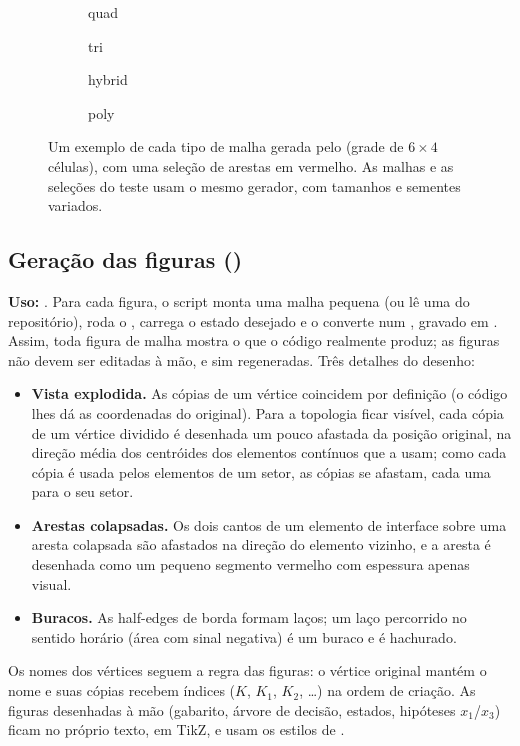 \begin{figure}[ht]
\centering
\begin{subfigure}[b]{0.24\linewidth}\centering\resizebox{\linewidth}{!}{}\caption{quad}\end{subfigure}\hfill
\begin{subfigure}[b]{0.24\linewidth}\centering\resizebox{\linewidth}{!}{}\caption{tri}\end{subfigure}\hfill
\begin{subfigure}[b]{0.24\linewidth}\centering\resizebox{\linewidth}{!}{}\caption{hybrid}\end{subfigure}\hfill
\begin{subfigure}[b]{0.24\linewidth}\centering\resizebox{\linewidth}{!}{}\caption{poly}\end{subfigure}
\caption{Um exemplo de cada tipo de malha gerada pelo  (grade de $6\times4$ células), com uma seleção
de arestas em vermelho. As malhas e as seleções do teste usam o mesmo gerador, com tamanhos e sementes variados.}
\label{fig:estresse-malhas}
\end{figure}

\subsection{Geração das figuras ()}

\textbf{Uso:} . Para cada figura, o script monta
uma malha pequena (ou lê uma do repositório), roda o , carrega o estado desejado e o converte num
, gravado em . Assim, toda figura de malha mostra o que o código realmente
produz; as figuras não devem ser editadas à mão, e sim regeneradas. Três detalhes do desenho:
\begin{itemize}
\item \textbf{Vista explodida.} As cópias de um vértice coincidem por definição (o código lhes dá as coordenadas do
original). Para a topologia ficar visível, cada cópia de um vértice dividido é desenhada um pouco afastada da posição
original, na direção média dos centróides dos elementos contínuos que a usam; como cada cópia é usada pelos elementos
de um setor, as cópias se afastam, cada uma para o seu setor.
\item \textbf{Arestas colapsadas.} Os dois cantos de um elemento de interface sobre uma aresta colapsada são afastados na
direção do elemento vizinho, e a aresta é desenhada como um pequeno segmento vermelho com espessura apenas visual.
\item \textbf{Buracos.} As half-edges de borda formam laços; um laço percorrido no sentido horário (área com sinal
negativa) é um buraco e é hachurado.
\end{itemize}
Os nomes dos vértices seguem a regra das figuras: o vértice original mantém o nome e suas cópias recebem índices
($K$, $K_1$, $K_2$, \dots) na ordem de criação. As figuras desenhadas à mão (gabarito, árvore de decisão, estados,
hipóteses $x_1$/$x_3$) ficam no próprio texto, em TikZ, e usam os estilos de .
